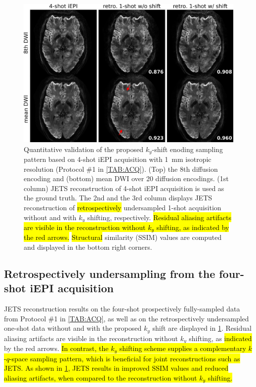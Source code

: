\documentclass[preprint,12pt,authoryear,review]{elsarticle}
\begin{document}
    \begin{figure}
        \centering
        \includegraphics[width=\textwidth]{../figures/fig5.png}
        \caption{Quantitative validation of the proposed
        $k_y$-shift enoding sampling pattern
        based on 4-shot iEPI acquisition with 1~mm isotropic resolution
        (Protocol \#1 in \cref{TAB:ACQ}).
        (Top) the 8th diffusion encoding and
        (bottom) mean DWI over 20 diffusion encodings.
        (1st column) JETS reconstruction of 4-shot iEPI acquisition
        is used as the ground truth.
        The 2nd and the 3rd column displays JETS reconstruction
        of \hl{retrospectively} undersampled
        1-shot acquisition without and with $k_y$ shifting,
        respectively.
        \hl{Residual aliasing artifacts are visible in the reconstruction
        without $k_y$ shifting, as indicated by the red arrows.}
        \hl{Structural} similarity (SSIM) values are computed and
        displayed in the bottom right corners.}
        \label{FIG:retro}
    \end{figure}

    \subsection{Retrospectively undersampling from the four-shot iEPI acquisition}

    JETS reconstruction results on
    the four-shot prospectively fully-sampled data
    from Protocol \#1 in \cref{TAB:ACQ},
    as well as on the retrospectively undersampled one-shot data
    without and with the proposed $k_y$ shift
    are displayed in \cref{FIG:retro}.
    Residual aliasing artifacts are visible in the reconstruction
    without $k_y$ shifting, as \hl{indicated} by the red arrows.
    \hl{In contrast, the $k_y$ shifting scheme supplies a complementary
    $k$-$q$-space sampling pattern,
    which is beneficial for joint reconstructions such as JETS.
    As shown in \mbox{\cref{FIG:retro}}, JETS results in
    improved SSIM values and reduced aliasing artifacts,
    when compared to the reconstruction without $k_y$ shifting.}
\end{document}
